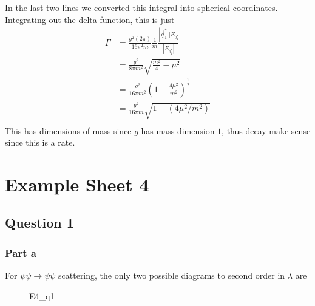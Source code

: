 In the last two lines we converted this integral into spherical 
coordinates. 
Integrating out the delta function, this is just 
\begin{align*} 
 \Gamma & = \frac{g ^ 2 ( 2 \pi ) }{ 16 \pi ^2 m} \frac{1}{m } \frac{ |\vec{q} _ 1 ^ * | | E_{ q_ 1 ^ * }}{
 | E_{ q_ 1 ^ * } | } \\ 
 &=  \frac{ g ^ 2 }{ 8 \pi m ^ 2 } \sqrt{ \frac{m ^ 2 }{ 4 }  - \mu ^ 2 }   \\ 
 &=  \frac{g ^ 2 }{ 16 \pi m ^ 2 } \left(  1 -\frac{4 \mu ^ 2 }{ m ^ 2 }  \right)^{ \frac{1}{2 } }  \\
 &=  \frac{g ^ 2 }{ 16 \pi m } \sqrt{ 1 - ( 4 \mu ^ 2 / m ^ 2 ) }  \\
\end{align*} 
This has dimensions of mass since $ g  $ has mass dimension $ 1 $, thus 
decay make sense since this is a rate. 
\pagebreak 

\section{Example Sheet 4}

\subsection*{Question 1} 

\subsubsection{Part a}
For $\psi \overline{ \psi } \to \psi \overline{ \psi }$ scattering, 
the only two possible diagrams to second 
order in $ \lambda $ are 
\begin{figure}[htpb]
\centering

\caption{E4_q1}%
\label{fig:e4_q1}
\end{figure}

